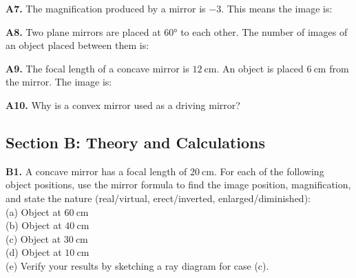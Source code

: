 \begin{exercisebox}[19]

\vspace{0.4cm}

\textbf{A7.} The magnification produced by a mirror
is $-3$. This means the image is:


\vspace{0.4cm}

\textbf{A8.} Two plane mirrors are placed at
$60°$ to each other. The number of images of an
object placed between them is:


\vspace{0.4cm}

\textbf{A9.} The focal length of a concave mirror
is $12\ \text{cm}$. An object is placed $6\ \text{cm}$
from the mirror. The image is:


\vspace{0.4cm}

\textbf{A10.} Why is a convex mirror used as a
driving mirror?


\vspace{0.6cm}

\subsection*{Section B: Theory and Calculations}

\textbf{B1.} A concave mirror has a focal length
of $20\ \text{cm}$. For each of the following object
positions, use the mirror formula to find the image
position, magnification, and state the nature
(real/virtual, erect/inverted, enlarged/diminished):\\[4pt]
(a) Object at $60\ \text{cm}$\\
(b) Object at $40\ \text{cm}$\\
(c) Object at $30\ \text{cm}$\\
(d) Object at $10\ \text{cm}$\\
(e) Verify your results by sketching a ray diagram
for case (c).
\hfill{}


\end{exercisebox}
